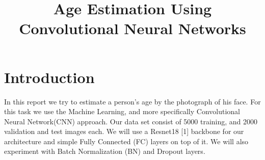 \documentclass[conference,compsoc]{IEEEtran}
\begin{document}
%
\title{Age Estimation Using Convolutional Neural Networks}


\author{
}









\maketitle






%
\IEEEpeerreviewmaketitle



\section{Introduction}
In this report we try to estimate a person's age by the photograph of his face. For this task we use the Machine Learning, and more specifically Convolutional Neural Network(CNN) approach. Our data set consist of 5000 training, and 2000 validation and test images each. We will use a Resnet18 [1] backbone for our architecture and simple Fully Connected (FC) layers on top of it. We will also experiment with Batch Normalization (BN) and Dropout layers.
\end{document}
